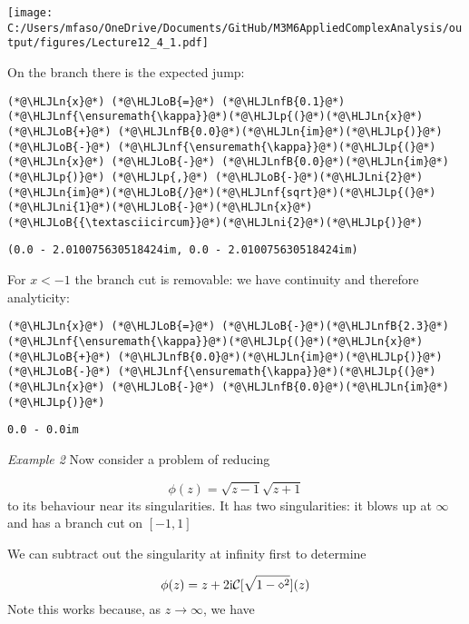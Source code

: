\documentclass[12pt,landscape]{article}
\newcommand{\HLJLn}[1]{#1}
\newcommand{\HLJLnf}[1]{\textcolor[RGB]{66,102,213}{#1}}
\newcommand{\HLJLnfB}[1]{\textcolor[RGB]{59,151,46}{#1}}
\newcommand{\HLJLni}[1]{\textcolor[RGB]{59,151,46}{#1}}
\newcommand{\HLJLoB}[1]{\textcolor[RGB]{102,102,102}{\textbf{#1}}}
\newcommand{\HLJLp}[1]{#1}
\def\I{ {\rm i} }
\def\cent#1{\begin{center}#1\end{center} }
\begin{document}
{\cent{\texttt{[image: C:/Users/mfaso/OneDrive/Documents/GitHub/M3M6AppliedComplexAnalysis/output/figures/Lecture12\_4\_1.pdf]}}

On the branch there is the expected jump:


\begin{lstlisting}
(*@\HLJLn{x}@*) (*@\HLJLoB{=}@*) (*@\HLJLnfB{0.1}@*)
(*@\HLJLnf{\ensuremath{\kappa}}@*)(*@\HLJLp{(}@*)(*@\HLJLn{x}@*) (*@\HLJLoB{+}@*) (*@\HLJLnfB{0.0}@*)(*@\HLJLn{im}@*)(*@\HLJLp{)}@*) (*@\HLJLoB{-}@*) (*@\HLJLnf{\ensuremath{\kappa}}@*)(*@\HLJLp{(}@*)(*@\HLJLn{x}@*) (*@\HLJLoB{-}@*) (*@\HLJLnfB{0.0}@*)(*@\HLJLn{im}@*)(*@\HLJLp{)}@*) (*@\HLJLp{,}@*) (*@\HLJLoB{-}@*)(*@\HLJLni{2}@*)(*@\HLJLn{im}@*)(*@\HLJLoB{/}@*)(*@\HLJLnf{sqrt}@*)(*@\HLJLp{(}@*)(*@\HLJLni{1}@*)(*@\HLJLoB{-}@*)(*@\HLJLn{x}@*)(*@\HLJLoB{{\textasciicircum}}@*)(*@\HLJLni{2}@*)(*@\HLJLp{)}@*)
\end{lstlisting}

\begin{lstlisting}
(0.0 - 2.010075630518424im, 0.0 - 2.010075630518424im)
\end{lstlisting}


For $x < -1$ the branch cut is removable: we have continuity and therefore analyticity:


\begin{lstlisting}
(*@\HLJLn{x}@*) (*@\HLJLoB{=}@*) (*@\HLJLoB{-}@*)(*@\HLJLnfB{2.3}@*)
(*@\HLJLnf{\ensuremath{\kappa}}@*)(*@\HLJLp{(}@*)(*@\HLJLn{x}@*) (*@\HLJLoB{+}@*) (*@\HLJLnfB{0.0}@*)(*@\HLJLn{im}@*)(*@\HLJLp{)}@*) (*@\HLJLoB{-}@*) (*@\HLJLnf{\ensuremath{\kappa}}@*)(*@\HLJLp{(}@*)(*@\HLJLn{x}@*) (*@\HLJLoB{-}@*) (*@\HLJLnfB{0.0}@*)(*@\HLJLn{im}@*)(*@\HLJLp{)}@*)
\end{lstlisting}

\begin{lstlisting}
0.0 - 0.0im
\end{lstlisting}


\newpage

\emph{Example 2} Now consider a problem of reducing

\[
\phi(z) = \sqrt{z-1} \sqrt{z+1}
\]
to its behaviour near its singularities. It has two singularities: it blows up at $\infty$ and has a branch cut on $[-1,1]$

We can subtract out the singularity at infinity first to determine

\[
\phi(z) = z  + 2 \I {\cal C}[\sqrt{1-\diamond^2}](z)
\]
Note this works because, as $z \rightarrow \infty$, we have

}
\end{document}
